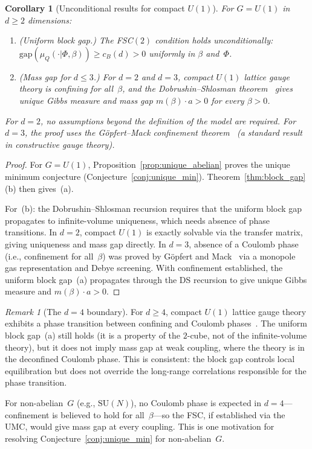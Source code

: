 \documentclass[11pt,a4paper]{article}
\theoremstyle{plain}
\newtheorem{corollary}[theorem]{Corollary}
\theoremstyle{definition}
\theoremstyle{remark}
\newtheorem{remark}[theorem]{Remark}
\newcommand{\SU}{\mathrm{SU}}
\newcommand{\gap}{\mathrm{gap}}
\begin{document}
\begin{corollary}[Unconditional results for compact $U(1)$]
\label{cor:U1}
For $G = U(1)$ in $d \geq 2$ dimensions:
\begin{enumerate}[label=\textup{(\alph*)},nosep]
  \item \textup{(Uniform block gap.)}
    The FSC$(2)$ condition holds unconditionally:
    $\gap(\mu_Q(\cdot|\Phi, \beta))
    \geq c_B(d) > 0$ uniformly in $\beta$ and~$\Phi$.
  \item \textup{(Mass gap for $d \leq 3$.)}
    For $d = 2$ and $d = 3$, compact $U(1)$ lattice gauge
    theory is confining for all~$\beta$, and the
    Dobrushin--Shlosman
    theorem~\cite{DobrushinShlosman,Martinelli1999}
    gives unique Gibbs measure and mass gap
    $m(\beta) \cdot a > 0$ for every $\beta > 0$.
\end{enumerate}
For $d = 2$, no assumptions beyond the definition of the
model are required.  For $d = 3$, the proof uses the
G\"opfert--Mack confinement theorem~\cite{GopfertMack82}
(a standard result in constructive gauge theory).
\end{corollary}

\begin{proof}
For $G = U(1)$, Proposition~\ref{prop:unique_abelian} proves
the unique minimum conjecture
(Conjecture~\ref{conj:unique_min}).
Theorem~\ref{thm:block_gap}(b) then gives~(a).

For~(b): the Dobrushin--Shlosman recursion requires that
the uniform block gap propagates to infinite-volume
uniqueness, which needs absence of phase transitions.
In $d = 2$, compact $U(1)$ is exactly solvable via the
transfer matrix, giving uniqueness and mass gap directly.
In $d = 3$, absence of a Coulomb phase (i.e., confinement
for all~$\beta$) was proved by
G\"opfert and Mack~\cite{GopfertMack82}
via a monopole gas representation and Debye screening.
With confinement established, the uniform block gap~(a)
propagates through the DS recursion to give unique
Gibbs measure and $m(\beta) \cdot a > 0$.
\end{proof}

\begin{remark}[The $d = 4$ boundary]
\label{rem:U1_d4}
For $d \geq 4$, compact $U(1)$ lattice gauge theory
exhibits a phase transition between confining and Coulomb
phases~\cite{Guth80}.  The uniform block gap~(a) still holds
(it is a property of the $2$-cube, not of the
infinite-volume theory), but it does not imply mass gap at
weak coupling, where the theory is in the deconfined Coulomb
phase.  This is consistent: the block gap controls local
equilibration but does not override the long-range
correlations responsible for the phase transition.

For non-abelian~$G$ (e.g., $\SU(N)$), no Coulomb phase is
expected in $d = 4$---confinement is believed to hold for
all~$\beta$---so the FSC, if established via the UMC,
would give mass gap at every coupling.  This is one
motivation for resolving Conjecture~\ref{conj:unique_min}
for non-abelian~$G$.
\end{remark}
\end{document}
